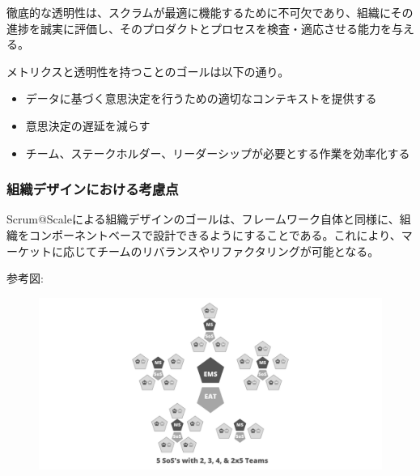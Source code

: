 \documentclass[12pt,a4paper,parskip=full]{scrartcl}
\begin{document}

徹底的な透明性は、スクラムが最適に機能するために不可欠であり、組織にその進捗を誠実に評価し、そのプロダクトとプロセスを検査・適応させる能力を与える。

メトリクスと透明性を持つことのゴールは以下の通り。

\begin{itemize}
\itemsep1pt\parskip0pt

\item
データに基づく意思決定を行うための適切なコンテキストを提供する
\item
意思決定の遅延を減らす
\item
チーム、ステークホルダー、リーダーシップが必要とする作業を効率化する
\end{itemize}

\subsubsection{組織デザインにおける考慮点}\label{some-notes-on-organizational-design}

Scrum@Scaleによる組織デザインのゴールは、フレームワーク自体と同様に、組織をコンポーネントベースで設計できるようにすることである。これにより、マーケットに応じてチームのリバランスやリファクタリングが可能となる。

参考図:
\begin{figure}[H]
    \centering
    \includegraphics[scale=0.15]{4.png}
\end{figure}
\end{document}

